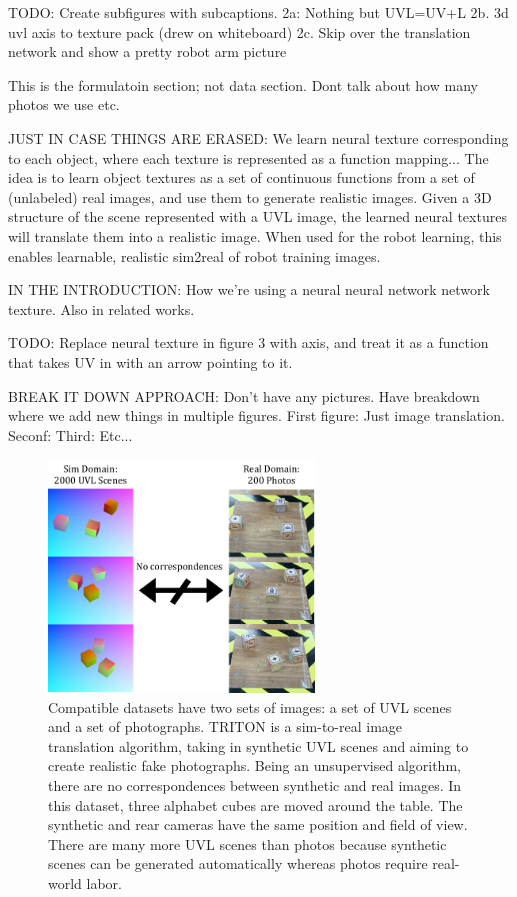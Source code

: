 \documentclass{article}
\begin{document}
TODO: Create subfigures with subcaptions. 
2a: Nothing but UVL=UV+L
2b. 3d uvl axis to texture pack (drew on whiteboard)
2c. Skip over the translation network and show a pretty robot arm picture

This is the formulatoin section; not data section. Dont talk about how many photos we use etc. 

JUST IN CASE THINGS ARE ERASED:
We learn neural texture corresponding to each object, where each texture is represented as a function mapping... 
The idea is to learn object textures as a set of continuous functions from a set of (unlabeled) real images, and use them to generate realistic images.
Given a 3D structure of the scene represented with a UVL image, the learned neural textures will translate them into a realistic image.
When used for the robot learning, this enables learnable, realistic sim2real of robot training images.

IN THE INTRODUCTION: How we're using a neural neural network network texture. Also in related works.

TODO: Replace neural texture in figure 3 with axis, and treat it as a function that takes UV in with an arrow pointing to it.

BREAK IT DOWN APPROACH:
Don't have any pictures. Have breakdown where we add new things in multiple figures.
First figure: Just image translation. 
Seconf:
Third:
Etc...


\begin{figure}[H]
	\begin{center}
		\includegraphics[width=200pt]{../images/dataset_explanation.pdf}
	\end{center}
	\caption{
		Compatible datasets have two sets of images: a set of UVL scenes and a set of photographs.
		TRITON is a sim-to-real image translation algorithm, taking in synthetic UVL scenes and aiming to create realistic fake photographs. 
		Being an unsupervised algorithm, there are no correspondences between synthetic and real images.
		In this dataset, three alphabet cubes are moved around the table. 
		The synthetic and rear cameras have the same position and field of view.
		There are many more UVL scenes than photos because synthetic scenes can be generated automatically whereas photos require real-world labor.
		}
	\label{fig:dataset_explanation}
\end{figure}
\end{document}
